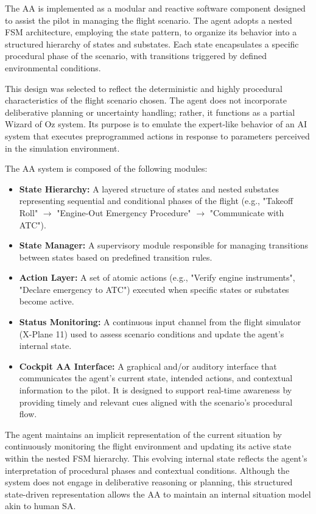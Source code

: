 \documentclass[12pt,a4paper]{article} %
\begin{document}
	The AA is implemented as a modular and reactive software component designed to assist the pilot in managing the flight scenario.
	The agent adopts a nested FSM architecture, employing the state pattern, to organize its behavior into a structured hierarchy of states and substates. Each state encapsulates a specific procedural phase of the scenario, with transitions triggered by defined environmental conditions.
	
	This design was selected to reflect the deterministic and highly procedural characteristics of the flight scenario chosen. The agent does not incorporate deliberative planning or uncertainty handling; rather, it functions as a partial Wizard of Oz system. Its purpose is to emulate the expert-like behavior of an AI system that executes preprogrammed actions in response to parameters perceived in the simulation environment.
	
	The AA system is composed of the following modules: 
	\begin{itemize} 
		\item \textbf{State Hierarchy:} A layered structure of states and nested substates representing sequential and conditional phases of the flight (e.g., "Takeoff Roll" $\rightarrow$ "Engine-Out Emergency Procedure" $\rightarrow$ "Communicate with ATC").
		\item \textbf{State Manager:} A supervisory module responsible for managing transitions between states based on predefined transition rules.
		\item \textbf{Action Layer:} A set of atomic actions (e.g., "Verify engine instruments", "Declare emergency to ATC") executed when specific states or substates become active.
		\item \textbf{Status Monitoring:} A continuous input channel from the flight simulator (X-Plane 11) used to assess scenario conditions and update the agent's internal state. 
		\item \textbf{Cockpit AA Interface:} A graphical and/or auditory interface that communicates the agent's current state, intended actions, and contextual information to the pilot. It is designed to support real-time awareness by providing timely and relevant cues aligned with the scenario's procedural flow.
	\end{itemize}

	The agent maintains an implicit representation of the current situation by continuously monitoring the flight environment and updating its active state within the nested FSM hierarchy. This evolving internal state reflects the agent's interpretation of procedural phases and contextual conditions. Although the system does not engage in deliberative reasoning or planning, this structured state-driven representation allows the AA to maintain an internal situation model akin to human SA.
\end{document}
